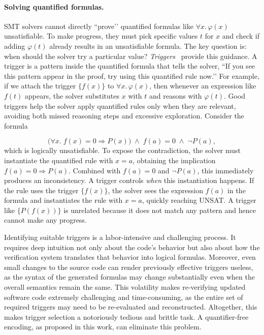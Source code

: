 \paragraph{Solving quantified formulas.}
SMT solvers cannot directly “prove’’ quantified formulas like 
$\forall x.\,\varphi(x)$ unsatisfiable. To make progress, they must pick specific 
values $t$ for $x$ and check if adding $\varphi(t)$ already results in an unsatisfiable formula. 
The key question is: when should the solver try a particular 
value? \emph{Triggers}~\cite{de2007efficient,clarke2018handbook} provide this guidance. A trigger is a pattern 
inside the quantified formula that tells the solver, “If you see this 
pattern appear in the proof, try using this quantified rule now.’’ For 
example, if we attach the trigger $\{f(x)\}$ to $\forall x.\,\varphi(x)$, 
then whenever an expression like $f(t)$ appears, the solver substitutes 
$x$ with $t$ and reasons with $\varphi(t)$. Good triggers help the solver apply 
quantified rules only when they are relevant, avoiding both missed 
reasoning steps and excessive exploration. Consider the formula

{
\small
\[
\big(\forall x.\; f(x)=0 \Rightarrow P(x)\big)
\;\land\;
f(a)=0
\;\land\;
\lnot P(a),
\]
}
which is logically unsatisfiable. To expose the contradiction, the solver 
must instantiate the quantified rule with $x=a$, obtaining the implication 
$f(a)=0 \Rightarrow P(a)$. Combined with $f(a)=0$ and $\lnot P(a)$, this 
immediately produces an inconsistency. A trigger controls \emph{when} this 
instantiation happens. If the rule uses the trigger $\{f(x)\}$, the solver 
sees the expression $f(a)$ in the formula and instantiates the rule with 
$x=a$, quickly reaching UNSAT. A trigger like $\{P(f(x))\}$ is unrelated because it does not match any pattern and hence cannot make any progress. 

Identifying suitable triggers is a labor-intensive and challenging process. It requires deep intuition not only about the code's behavior but also about how the verification system translates that behavior into logical formulas. Moreover, even small changes to the source code can render previously effective triggers useless, as the syntax of the generated formulas may change substantially even when the overall semantics remain the same. This volatility makes re-verifying updated software code extremely challenging and time-consuming, as the entire set of required triggers may need to be re-evaluated and reconstructed. Altogether, this makes trigger selection a notoriously tedious and brittle task. A quantifier-free encoding, as proposed in this work, can eliminate this problem.



